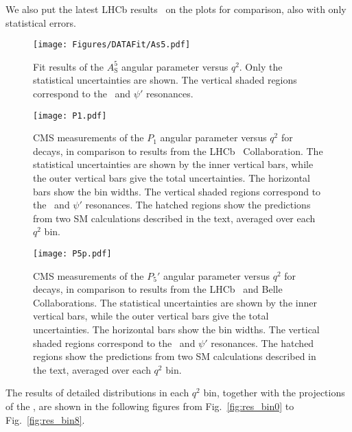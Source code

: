 We also put the latest LHCb results~\cite{LHCbP5p} on the plots for comparison, also with only statistical errors.

\begin{figure}[!hbtp]
  \centering
  \texttt{[image: Figures/DATAFit/As5.pdf]}
  \caption{Fit results of the $A^5_\mathrm{S}$ angular parameter versus $q^2$.
    Only the statistical uncertainties are shown.
    The vertical shaded regions correspond to the \cPJgy\ and $\psi'$ resonances.}
  \label{fig:fitresultAs5}
\end{figure}


\begin{figure}[htbp!]
  \begin{center}
    \texttt{[image: P1.pdf]}
    \caption{CMS measurements of the $P_1$ angular parameter versus $q^2$ for \BtoKstmumu decays, in comparison to results from the LHCb~\cite{LHCbP5p2} Collaboration.
      The statistical uncertainties are shown by the inner vertical bars, while the outer vertical bars give the total uncertainties.
      The horizontal bars show the bin widths. The vertical shaded regions correspond to the \cPJgy\ and $\psi'$ resonances.
      The hatched regions show the predictions from two SM calculations described in the text, averaged over each $q^2$ bin.}
    \label{fig:fitresultP1}
  \end{center}
\end{figure}

\begin{figure}[htbp!]
  \begin{center}
    \texttt{[image: P5p.pdf]}
    \caption{CMS measurements of the $P_5'$ angular parameter versus $q^2$ for \BtoKstmumu decays, in comparison to results from the LHCb~\cite{LHCbP5p2} and Belle~\cite{BelleP5p} Collaborations.
      The statistical uncertainties are shown by the inner vertical bars, while the outer vertical bars give the total uncertainties.
      The horizontal bars show the bin widths. The vertical shaded regions correspond to the \cPJgy\ and $\psi'$ resonances.
      The hatched regions show the predictions from two SM calculations described in the text, averaged over each $q^2$ bin.}
    \label{fig:fitresultp5}
  \end{center}
\end{figure}

The results of detailed distributions in each $q^2$ bin, together with the projections of the \pdf, are shown in the following figures from Fig.~\ref{fig:res_bin0} to Fig.~\ref{fig:res_bin8}.

